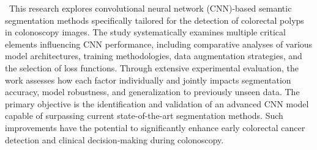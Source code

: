 \ This research explores convolutional neural network (CNN)-based semantic segmentation methods specifically tailored for the detection of colorectal polyps in colonoscopy images. The study systematically examines multiple critical elements influencing CNN performance, including comparative analyses of various model architectures, training methodologies, data augmentation strategies, and the selection of loss functions. Through extensive experimental evaluation, the work assesses how each factor individually and jointly impacts segmentation accuracy, model robustness, and generalization to previously unseen data. The primary objective is the identification and validation of an advanced CNN model capable of surpassing current state-of-the-art segmentation methods. Such improvements have the potential to significantly enhance early colorectal cancer detection and clinical decision-making during colonoscopy.